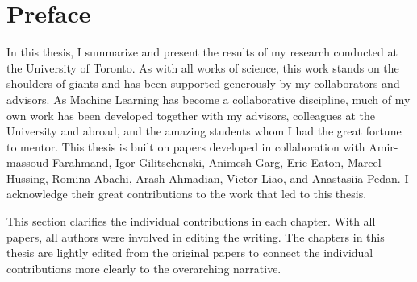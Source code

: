 \chapter*{Preface}

In this thesis, I summarize and present the results of my research conducted at the University of Toronto.
As with all works of science, this work stands on the shoulders of giants and has been supported generously by my collaborators and advisors.
As Machine Learning has become a collaborative discipline, much of my own work has been developed together with my advisors, colleagues at the University and abroad, and the amazing students whom I had the great fortune to mentor.
This thesis is built on papers developed in collaboration with Amir-massoud Farahmand, Igor Gilitschenski, Animesh Garg, Eric Eaton, Marcel Hussing, Romina Abachi, Arash Ahmadian, Victor Liao, and Anastasiia Pedan.
I acknowledge their great contributions to the work that led to this thesis.

This section clarifies the individual contributions in each chapter. With all papers, all authors were involved in editing the writing.
The chapters in this thesis are lightly edited from the original papers to connect the individual contributions more clearly to the overarching narrative.

